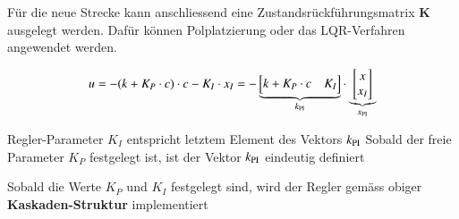 Für die neue Strecke kann anschliessend eine Zustandsrückführungsmatrix $\bm{K}$ ausgelegt werden. 
Dafür können Polplatzierung oder das LQR-Verfahren angewendet werden.

\vspace{-0.1cm}

$$ u = -(k + K_P \cdot c) \cdot c - K_I \cdot x_I = - \underbrace{ \begin{bmatrix} k + K_P \cdot c & K_I \end{bmatrix}}_{k_{\rm PI}} \cdot \underbrace{ \begin{bmatrix} x \\ x_I \end{bmatrix} }_{x_{\rm PI}} $$


\begin{outline}
    \1 Regler-Parameter $K_I$ entspricht letztem Element des Vektors $k_{\rm PI}$
    \1 Sobald der freie Parameter $K_P$ festgelegt ist, ist der Vektor $k_{\rm PI}$ eindeutig definiert
\end{outline}

\smallskip

Sobald die Werte $K_P$ und $K_I$ festgelegt sind, wird der Regler gemäss obiger \textbf{Kaskaden-Struktur} implementiert

